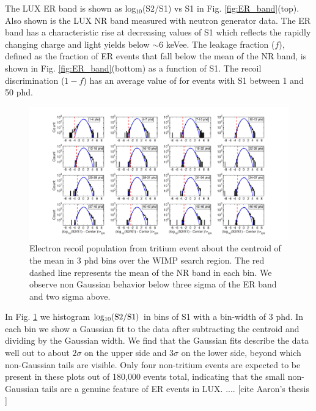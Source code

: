 The LUX ER band is shown as log$_{10}$(S2/S1) vs S1 in Fig. \ref{fig:ER_band}(top).  Also shown is the LUX NR band measured with neutron generator data\cite{DD-paper, lux-reanalysis}. The ER band has a characteristic rise at decreasing values of S1 which reflects the rapidly changing charge and light yields below $\sim$6 keVee. The leakage fraction ($f$), defined as the fraction of ER events that fall below the mean of the NR band, is shown in Fig. \ref{fig:ER_band}(bottom) as a function of S1. The recoil discrimination ($1-f$) has an average value of  for events with S1 between 1 and 50 phd.


\onecolumngrid
\break
\begin{figure}\centering
\includegraphics[width=220mm]{fig/Gaussianity/GaussER_all.png}
\caption{Electron recoil population from tritium event about the centroid of the mean in 3 phd bins over the WIMP search region. The red dashed line represents the mean of the NR band in each bin. We observe non Gaussian behavior below three sigma of the ER band and two sigma above.  }
\label{fig:ER-Gauss}
\end{figure}
\twocolumngrid

In Fig. \ref{fig:ER-Gauss} we histogram $\rm log_{10}(S2/S1)$ in bins of S1 with a bin-width of 3 phd. In each bin we show a Gaussian fit to the data after subtracting the centroid and dividing by the Gaussian width. We find that the Gaussian fits describe the data well out to about $2\sigma$ on the upper side and $3\sigma$ on the lower side, beyond which non-Gaussian tails are visible. Only four non-tritium events are expected to be present in these plots out of 180,000 events total, indicating that the small non-Gaussian tails are a genuine feature of ER events in LUX. .... [cite Aaron's thesis ]

